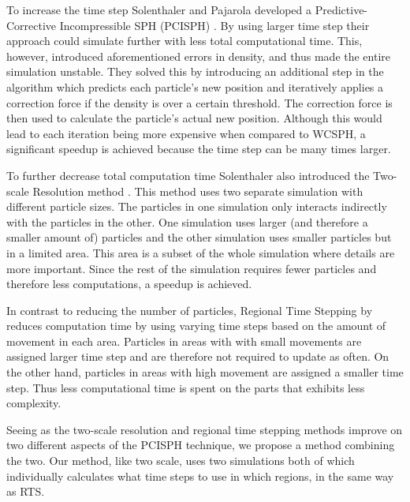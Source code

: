 \documentclass[../../main.tex]{subfiles}
\begin{document}
To increase the time step Solenthaler and Pajarola developed a Predictive-Corrective Incompressible SPH (PCISPH) \citep{solenthaler2009predictive}. By using larger time step their approach could simulate further with less total computational time. This, however, introduced aforementioned errors in density, and thus made the entire simulation unstable. They solved this by introducing an additional step in the algorithm which predicts each particle's new position and iteratively applies a correction force if the density is over a certain threshold. The correction force is then used to calculate the particle's actual new position. Although this would lead to each iteration being more expensive when compared to WCSPH, a significant speedup is achieved because the time step can be many times larger.

To further decrease total computation time Solenthaler also introduced the Two-scale Resolution method \citep{solenthaler2011two}. This method uses two separate simulation with different particle sizes. The particles in one simulation only interacts indirectly with the particles in the other. One simulation uses larger (and therefore a smaller amount of) particles and the other simulation uses smaller particles but in a limited area. This area is a subset of the whole simulation where details are more important. Since the rest of the simulation requires fewer particles and therefore less computations, a speedup is achieved. 

In contrast to reducing the number of particles, Regional Time Stepping by \citet{goswami2014regional} reduces computation time by using varying time steps based on the amount of movement in each area. Particles in areas with with small movements are assigned larger time step and are therefore not required to update as often. On the other hand, particles in areas with high movement are assigned a smaller time step. Thus less computational time is spent on the parts that exhibits less complexity.

Seeing as the two-scale resolution and regional time stepping methods improve on two different aspects of the PCISPH technique, we propose a method combining the two. Our method, like two scale, uses two simulations both of which individually calculates what time steps to use in which regions, in the same way as RTS. 

\end{document}
